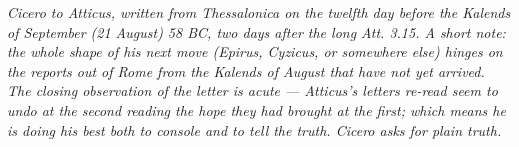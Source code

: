 
\textit{Cicero to Atticus, written from Thessalonica on the
twelfth day before the Kalends of September (21 August) 58 BC,
two days after the long Att. 3.15. A short note: the whole
shape of his next move (Epirus, Cyzicus, or somewhere else)
hinges on the reports out of Rome from the Kalends of August
that have not yet arrived. The closing observation of the
letter is acute --- Atticus's letters re-read seem to undo at
the second reading the hope they had brought at the first;
which means he is doing his best both to console and to tell
the truth. Cicero asks for plain truth.}

